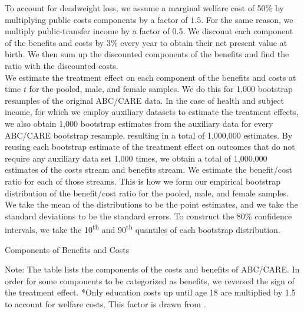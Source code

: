 \noindent To account for deadweight loss, we assume a marginal welfare cost of 50\% by multiplying
public costs components by a factor of $1.5$. For the same reason, we multiply public-transfer
income by a factor of 0.5. We discount each component of the benefits and costs
by 3\% every year to obtain their net present value at birth. We then sum up the discounted
components of the benefits and find the ratio with the discounted costs. \\

\noindent We estimate the treatment effect on each
component of the benefits and costs at time $t$ for the pooled, male, and
female samples. We do this for 1,000 bootstrap resamples of the original ABC/CARE data.
In the case of health and subject income, for which we employ auxiliary datasets to
estimate the treatment effects, we also obtain 1,000 bootstrap estimates from the auxiliary data
for every ABC/CARE bootstrap resample, resulting in a total of 1,000,000 estimates.
By reusing each bootstrap estimate of the treatment effect on outcomes that do not require any auxiliary data
set 1,000 times, we obtain a total of 1,000,000 estimates of the costs stream and benefits stream.
We estimate the benefit/cost ratio for each of those streams.
This is how we form our empirical bootstrap distribution of the benefit/cost ratio for the pooled, male, and female samples.
We take the mean of the distributions to be the point estimates, and we take the standard deviations
to be the standard errors. To construct the 80\% confidence intervals, we take the 10\textsuperscript{th}
and 90\textsuperscript{th} quantiles of each bootstrap distribution.

\begin{table}[H]
\begin{threeparttable}
\caption{Components of Benefits and Costs}
\label{table:bc_comp}
\centering

\begin{tablenotes}
\footnotesize
\item Note: The table lists the components of the costs and benefits of ABC/CARE.
In order for some components to be categorized as benefits, we reversed the sign
of the treatment effect. *Only education costs up until age 18 are multiplied by 1.5 to account for welfare costs. This factor is drawn from \citet{Heckman_Moon_etal_2010_RateofReturn}.
\end{tablenotes}
\end{threeparttable}
\end{table}


